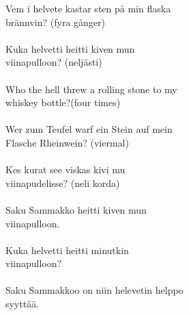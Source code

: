 
Vem i helvete kastar sten på min flaska \\ brännvin? (fyra gånger) \\ \hspace{10mm} \\ Kuka helvetti heitti kiven mun \\ viinapulloon? (neljästi) \\ \hspace{10mm} \\ Who the hell threw a rolling stone to my \\ whiskey bottle?(four times) \\ \hspace{10mm} \\ Wer zum Teufel warf ein Stein auf mein \\ Flasche Rheinwein? (viermal) \\ \hspace{10mm} \\ Kes kurat see viskas kivi mu \\ viinapudelisse? (neli korda) \\ \hspace{10mm} \\ Saku Sammakko heitti kiven mun \\ viinapulloon. \\ \hspace{10mm} \\ Kuka helvetti heitti minutkin \\ viinapulloon? \\ \hspace{10mm} \\ Saku Sammakkoo on niin helevetin helppo \\ syyttää.